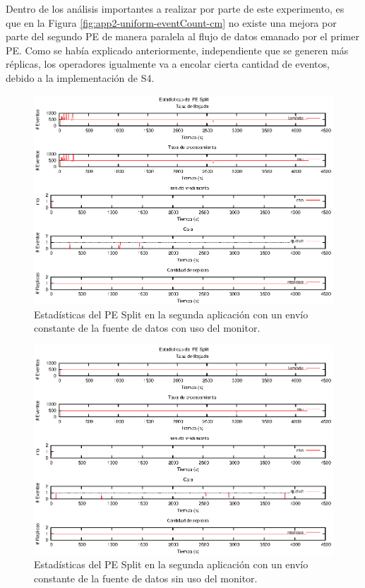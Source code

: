 Dentro de los análisis importantes a realizar por parte de este experimento, es que en la Figura \ref{fig:app2-uniform-eventCount-cm} no existe una mejora por parte del segundo PE de manera paralela al flujo de datos emanado por el primer PE. Como se había explicado anteriormente, independiente que se generen más réplicas, los operadores igualmente va a encolar cierta cantidad de eventos, debido a la implementación de S4.

\begin{figure}[p]
\centering
    \includegraphics[scale=1.1]{images/exp/app2/uniform/cm/statusSplitPE.eps}
    \caption{Estadísticas del PE Split en la segunda aplicación con un envío constante de la fuente de datos con uso del monitor.}
    \label{fig:app2-uniform-statusSplitPE-cm}
\end{figure}

\begin{figure}[p]
\centering
    \includegraphics[scale=1.1]{images/exp/app2/uniform/sm/statusSplitPE.eps}
    \caption{Estadísticas del PE Split en la segunda aplicación con un envío constante de la fuente de datos sin uso del monitor.}
    \label{fig:app2-uniform-statusSplitPE-sm}
\end{figure}

